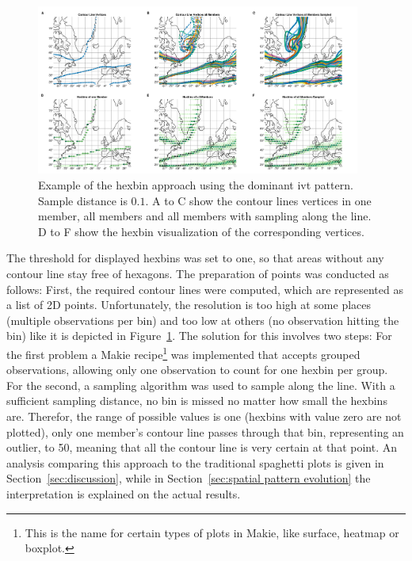 \begin{figure}
  \begin{center}
    \includegraphics[width=0.95\textwidth]{figures/hexbin_approach_overview.png}
  \end{center}
  \caption{Example of the hexbin approach using the dominant \ac{ivt} pattern. Sample distance is $0.1$. A to C show the contour lines vertices in one member, all members and all members with sampling along the line. D to F show the hexbin visualization of the corresponding vertices.}\label{fig:hexbin overview}
\end{figure}
The threshold for displayed hexbins was set to one, so that areas without any contour line stay free of hexagons. 
The preparation of points was conducted as follows: First, the required contour lines were computed, which are represented as a list of 2D points. 
Unfortunately, the resolution is too high at some places (multiple observations per bin) and too low at others (no observation hitting the bin) like it is depicted in Figure~\ref{fig:hexbin overview}. 
The solution for this involves two steps: 
For the first problem a Makie recipe\footnote{This is the name for certain types of plots in Makie, like surface, heatmap or boxplot.} was implemented that accepts grouped observations, allowing only one observation to count for one hexbin per group. 
For the second, a sampling algorithm  was used to sample along the line. 
With a sufficient sampling distance, no bin is missed no matter how small the hexbins are. 
Therefor, the range of possible values is one (hexbins with value zero are not plotted), only one member's contour line passes through that bin, representing an outlier, to 50, meaning that all the contour line is very certain at that point. 
An analysis comparing this approach to the traditional spaghetti plots is given in Section~\ref{sec:discussion}, while in Section~\ref{sec:spatial pattern evolution} the interpretation is explained on the actual results. 


